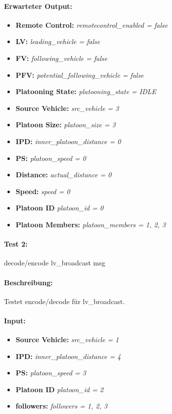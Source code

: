 \documentclass[a4paper, 12pt, titlepage]{scrartcl}
\begin{document}
{			\paragraph{Erwarteter Output:}
			\begin{itemize} \itemsep-0.5em
				\item \textbf{Remote Control:} \emph{remotecontrol\_enabled = false}
				\item \textbf{LV:} \emph{leading\_vehicle = false}
				\item \textbf{FV:} \emph{following\_vehicle = false}
				\item \textbf{PFV:} \emph{potential\_following\_vehicle = false}
				\item \textbf{Platooning State:} \emph{platooning\_state = IDLE}
				\item \textbf{Source Vehicle:} \emph{src\_vehicle = 3}
				\item \textbf{Platoon Size:} \emph{platoon\_size = 3}
				\item \textbf{IPD:} \emph{inner\_platoon\_distance = 0}
				\item \textbf{PS:} \emph{platoon\_speed = 0}
				\item \textbf{Distance:} \emph{actual\_distance = 0}
				\item \textbf{Speed:} \emph{speed = 0}
				\item \textbf{Platoon ID} \emph{platoon\_id = 0}
				\item \textbf{Platoon Members:} \emph{platoon\_members = {1, 2, 3}}
			\end{itemize}

			\paragraph{Test 2:}{decode/encode lv\_broadcast msg}
			\paragraph{Beschreibung:} Testet encode/decode für lv\_broadcast.
			\paragraph{Input:}
			\begin{itemize} \itemsep-0.5em
				\item \textbf{Source Vehicle:} \emph{src\_vehicle = 1}
				\item \textbf{IPD:} \emph{inner\_platoon\_distance = 4}
				\item \textbf{PS:} \emph{platoon\_speed = 3}
				\item \textbf{Platoon ID} \emph{platoon\_id = 2}
				\item \textbf{followers:} \emph{followers = {1, 2, 3}}
			\end{itemize}
}
\end{document}
